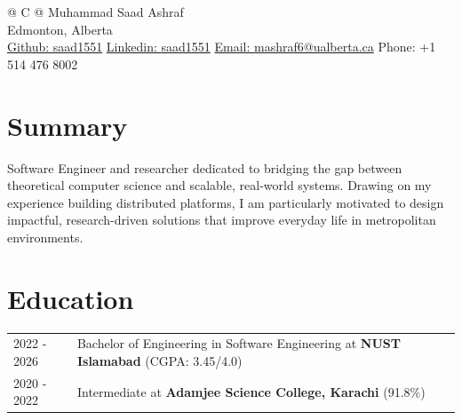 \documentclass[a4paper,9pt]{extarticle}
\begin{document}
\pagestyle{empty} 



\begin{tabularx}{\linewidth}{@{} C @{}}
\Huge{Muhammad Saad Ashraf} \\[7.5pt]
Edmonton, Alberta \\
\href{https://github.com/saad1551}{Github: saad1551}\hspace{1em}
\href{https://linkedin.com/in/saadashraf380715222}{Linkedin: saad1551}\hspace{1em}
\href{mailto:mashraf6@ualberta.ca}{Email: mashraf6@ualberta.ca}\hspace{1em}
Phone: +1 514 476 8002 \\
\end{tabularx}






\section{Summary}
Software Engineer and researcher dedicated to bridging the gap between theoretical computer science and scalable, real-world systems. Drawing on my experience building distributed platforms, I am particularly motivated to design impactful, research-driven solutions that improve everyday life in metropolitan environments.


\section{Education}
\begin{tabularx}{\linewidth}{@{}l X@{}}	
2022 - 2026 & Bachelor of Engineering in Software Engineering at \textbf{NUST Islamabad} \hfill \normalsize (CGPA: 3.45/4.0) \\

2020 - 2022 & Intermediate at \textbf{Adamjee Science College, Karachi} \hfill \normalsize (91.8\%) \\

\end{tabularx}
\end{document}
